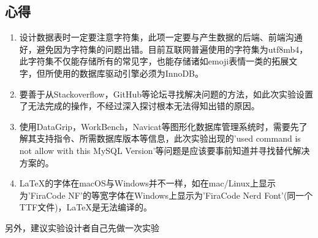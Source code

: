 \documentclass[a4paper,UTF8,heading=false,12pt]{article}
\begin{document}
\subsection{心得}

\begin{enumerate}
    \item 设计数据表时一定要注意字符集，此项一定要与产生数据的后端、前端沟通好，避免因为字符集的问题出错。目前互联网普遍使用的字符集为utf8mb4，此字符集不仅能存储所有的常见字，也能存储诸如emoji表情一类的拓展文字，但所使用的数据库驱动引擎必须为InnoDB。
    \item 要善于从Stackoverflow，GitHub等论坛寻找解决问题的方法，如此次实验设置了无法完成的操作，不经过深入探讨根本无法得知出错的原因。
    \item 使用DataGrip，WorkBench，Navicat等图形化数据库管理系统时，需要先了解其支持指令、所需数据库版本等信息，此次实验出现的'used command is not allow with this MySQL Version'等问题是应该要事前知道并寻找替代解决方案的。
    \item \LaTeX 的字体在macOS与Windows并不一样，如在mac/Linux上显示为'FiraCode NF'的等宽字体在Windows上显示为'FiraCode Nerd Font'(同一个TTF文件)，\LaTeX 是无法编译的。
\end{enumerate}


另外，\huge{建议实验设计者自己先做一次实验}
\end{document}
